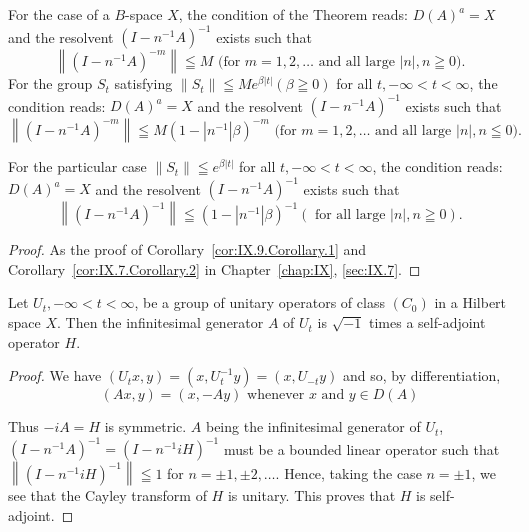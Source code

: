 \begin{corollary}\label{cor:IX.9.Corollary.1} For the case of a $B$-space $X$, the condition of the Theorem reads: $D(A)^{a} = X$ and the resolvent $(I - n^{-1}A)^{-1}$ exists such that 
\begin{equation}\label{eq:IX.9.2}
\left\|(I - n ^{-1} A)^{-m}\right\| \leqq M \text{ (for } m = 1, 2, \ldots \text{ and all large } |n|, n \geqq 0).
\end{equation}
For the group $S_{t}$ satisfying $\left\|S_{t}\right\| \leqq M e^{\beta |t|} (\beta \geqq 0)$ for all $t, -\infty < t < \infty$, the condition reads: $D(A)^{a} = X$ and the resolvent $(I - n^{-1}A)^{-1}$ exists such that 
\begin{equation}\label{eq:IX.9.3}
\left\| (I - n ^{-1} A) ^{-m} \right\| \leqq M (1 - | n ^{-1} | \beta) ^{-m} \text{ (for } m = 1, 2, \ldots \text{ and all large } |n|, n \leqq 0).
\end{equation}
\end{corollary}


For the particular case $\| S_t \| \leqq e^{\beta |t|}$ for all $t, -\infty < t < \infty$, the condition reads: $D(A)^a = X$ and the resolvent $(I - n^{-1}A)^{-1}$ exists such that 
\begin{equation}\label{eq:IX.9.4}
\left\| (I - n ^{-1} A) ^{-1} \right\| \leqq (1 - | n ^{-1} | \beta) ^{-1} (\text{ for all large } | n |, n \geqq 0).
\end{equation}

\begin{proof}
 As the proof of Corollary~\ref{cor:IX.9.Corollary.1} and Corollary~\ref{cor:IX.7.Corollary.2} in Chapter~\ref{chap:IX}, \ref{sec:IX.7}. \end{proof}

\begin{corollary}\label{cor:IX.9.Corollary.2} Let $U_{t}, -\infty < t < \infty$, be a group of unitary operators of class $(C_{0})$ in a Hilbert space $X$. Then the infinitesimal generator $A$ of $U_{t}$ is $\sqrt{-1}$ times a self-adjoint operator $H$. 
\end{corollary}

\begin{proof}
 We have $(U_{t}x,y) = (x,U_{t}^{-1}y) = (x,U_{-t}y)$ and so, by differentiation, 
\[
(A x, y) = (x, - A y) \text{ whenever } x \text{ and } y \in D (A) \]

Thus $-iA = H$ is symmetric. $A$ being the infinitesimal generator of $U_{t}$, $(I - n^{-1}A)^{-1} = (I - n^{-1}iH)^{-1}$ must be a bounded linear operator such that $\left\|(I - n^{-1}iH)^{-1}\right\| \leqq 1$ for $n = \pm 1, \pm 2, \ldots$. Hence, taking the case $n = \pm 1$, we see that the Cayley transform of $H$ is unitary. This proves that $H$ is self-adjoint. 
\end{proof}

